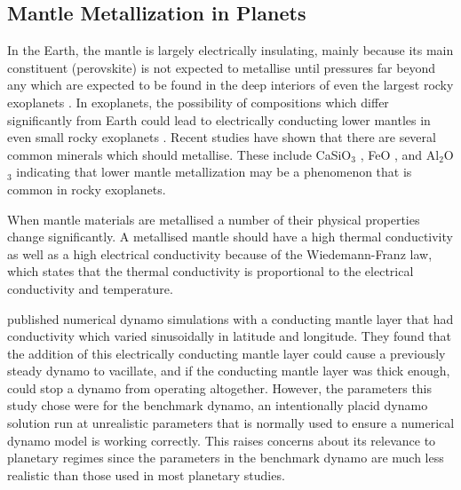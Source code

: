 \subsection{Mantle Metallization in Planets}
In the Earth, the mantle is largely electrically insulating, mainly because its main constituent (perovskite) is not expected to metallise until pressures far beyond any which are expected to be found in the deep interiors of even the largest rocky exoplanets \citep{tsuchiya2011}. In exoplanets, the possibility of compositions which differ significantly from Earth could lead to electrically conducting lower mantles in even small rocky exoplanets \citep{ohta2012}. Recent studies have shown that there are several common minerals which should metallise. These include CaSiO$_{3}$ \citep{tsuchiya2011}, FeO \citep{ohta2012}, and Al$_{2}$O$_{3}$ \citep{nellis2010} indicating that lower mantle metallization may be a phenomenon that is common in rocky exoplanets.

When mantle materials are metallised a number of their physical properties change significantly. A metallised mantle should have a high thermal conductivity as well as a high electrical conductivity because of the Wiedemann-Franz law, which states that the thermal conductivity is proportional to the electrical conductivity and temperature. %

\citet{chan2008} published numerical dynamo simulations with a conducting mantle layer that had  conductivity which varied sinusoidally in latitude and longitude. They found that the addition of this electrically conducting mantle layer could cause a previously steady dynamo to vacillate, and if the conducting mantle layer was thick enough, could stop a dynamo from operating altogether. However, the parameters this study chose were for the benchmark dynamo, an intentionally placid dynamo solution run at unrealistic parameters that is normally used to ensure a numerical dynamo model is working correctly. This raises concerns about its relevance to planetary regimes since the parameters in the benchmark dynamo are much less realistic than those used in most planetary studies.

